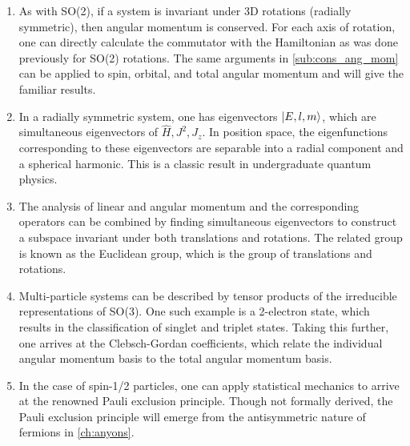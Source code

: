 \begin{enumerate}
    \item As with SO(2), if a system is invariant under 3D rotations (radially symmetric), then angular momentum is conserved. For each axis of rotation, one can directly calculate the commutator with the Hamiltonian as was done previously for SO(2) rotations. The same arguments in \cref{sub:cons_ang_mom} can be applied to spin, orbital, and total angular momentum and will give the familiar results.
    \item In a radially symmetric system, one has eigenvectors $\ket{E,l,m}$, which are simultaneous eigenvectors of $\hat{H},J^2,J_z$. In position space, the eigenfunctions corresponding to these eigenvectors are separable into a radial component and a spherical harmonic. This is a classic result in undergraduate quantum physics.
    \item The analysis of linear and angular momentum and the corresponding operators can be combined by finding simultaneous eigenvectors to construct a subspace invariant under both translations and rotations. The related group is known as the Euclidean group, which is the group of translations and rotations.
    \item Multi-particle systems can be described by tensor products of the irreducible representations of SO(3). One such example is a 2-electron state, which results in the classification of singlet and triplet states. Taking this further, one arrives at the Clebsch-Gordan coefficients, which relate the individual angular momentum basis to the total angular momentum basis.
    \item In the case of spin-1/2 particles, one can apply statistical mechanics to arrive at the renowned Pauli exclusion principle. Though not formally derived, the Pauli exclusion principle will emerge from the antisymmetric nature of fermions in \cref{ch:anyons}.
\end{enumerate}



